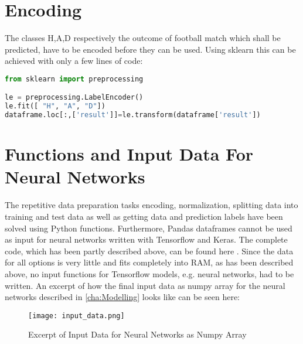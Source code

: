 \section {Encoding}

The classes H,A,D respectively the outcome of football match which shall be predicted, have to be encoded before they can be used. Using sklearn this can be achieved with only a few lines of code:

\begin{lstlisting}[language=Python, caption=Python code for encoding classes]
from sklearn import preprocessing

le = preprocessing.LabelEncoder()
le.fit([ "H", "A", "D"])
dataframe.loc[:,['result']]=le.transform(dataframe['result'])
\end{lstlisting}


\section {Functions and Input Data For Neural Networks}
The repetitive data preparation tasks encoding, normalization, splitting data into training and test data as well as getting data and prediction labels have been solved using Python functions. Furthermore, Pandas dataframes cannot be used as input for neural networks written with Tensorflow and Keras. The complete code, which has been partly described above, can be found here \cite{colab_nn}.
\newline
Since the data for all options is very little and fits completely into RAM, as has been described above, no input functions for Tensorflow models, e.g. neural networks, had to be written. An excerpt of how the final input data as numpy array for the neural networks described in \autoref{cha:Modelling} looks like can be seen here:

\begin{figure}[H]
\begin{center}
\texttt{[image: input\_data.png]}
\end{center}
\caption{Excerpt of Input Data for Neural Networks as Numpy Array}
\label{fig:inpud_data}
\end{figure}














